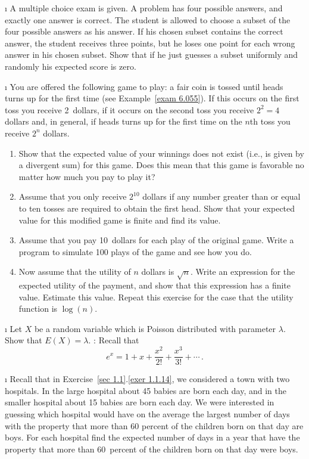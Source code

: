 \begin{LJSItem}
\i\label{exer 6.1.20} A multiple choice exam is given.  A problem has four
possible answers, and exactly one answer is correct.  The student is allowed to
choose a subset of the four possible answers as his answer.  If his chosen subset
contains the correct answer, the student receives three points, but he loses one
point for each wrong answer in his chosen subset.  Show that if he just guesses a
subset uniformly and randomly his expected score is zero.

\i\label{exer 6.1.21} You are offered the following game to play: a fair coin is
tossed until heads turns up for the first time (see Example~\ref{exam 6.055}).  If
this occurs on the first toss you receive 2~dollars, if it occurs on the second toss
you receive $2^2 = 4$ dollars and, in general, if heads turns up for the first time
on the $n$th toss you receive $2^n$ dollars.

\begin{enumerate}
\item Show that the expected value of your winnings does not exist (i.e., is given by
a divergent sum) for this game.  Does this mean that this game is favorable no matter
how much you pay to play it?

\item Assume that you only receive $2^{10}$ dollars if any number greater than or
equal to ten tosses are required to obtain the first head.  Show that your expected
value for this modified game is finite and find its value.

\item Assume that you pay 10~dollars for each play of the original game.  Write a
program to simulate 100 plays of the game and see how you do.

\item Now assume that the utility of $n$ dollars is $\sqrt n$.  Write an expression
for the expected utility of the payment, and show that this expression has a finite 
value.  Estimate this value.  Repeat this exercise for the case that the utility
function is $\log(n)$.

\end{enumerate}

\i\label{exer 6.1.100} Let $X$ be a random variable which is
Poisson distributed with parameter $\lambda$.  Show that $E(X) = \lambda$.  : 
Recall that 
$$e^x = 1 + x + \frac{x^2}{2!} + \frac{x^3}{3!} + \cdots\,.$$

\i\label{exer 6.1.22} Recall that in Exercise~\ref{sec 1.1}.\ref{exer 1.1.14}, we
considered a town with two hospitals.  In the large hospital about 45 babies are
born each day, and in the smaller hospital about 15 babies are born each day.  We were
interested in  guessing which hospital would have on the average the largest number of
days with the property that more than 60 percent of the children born on that day are
boys.  For each hospital find the expected number of days in a year that have the
property that more than 60~percent of the children born on that day were boys.


\end{LJSItem}
